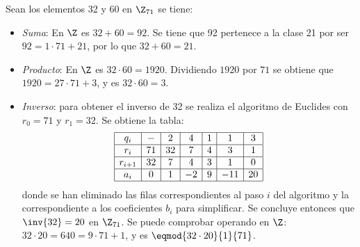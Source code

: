 \begin{TFGampliado}
\begin{ej}
    Sean los elementos 32 y 60 en $\Z_{71}$ se tiene:
        \begin{itemize}[label={--}]
            \item \textit{Suma}: En $\Z$ es $32 + 60 = 92$. Se tiene que 92 pertenece a la clase 21 por ser $92 = 1\cdot 71 + 21$, por lo que $32 + 60 = 21$.
            \item \textit{Producto}: En $\Z$ es $32 \cdot 60 = 1920$. Dividiendo $1920$ por $71$ se obtiene que $1920 = 27 \cdot 71 + 3$, y es $32 \cdot 60 = 3$.
            \item \textit{Inverso}: para obtener el inverso de 32 se realiza el algoritmo de Euclides con $r_0 = 71$ y $r_1 = 32$. Se obtiene la tabla:
            \renewcommand{\arraystretch}{1.3}
            \[
                \begin{array}{|c|c|c|c|c|c|c|}
                    \hline
                    q_i     &  - & 2  & 4 & 1 & 1   &  3\\
                    \hline
                    r_i     & 71 & 32 & 7 & 4 & 3   &   1\\
                    \hline
                    r_{i+1} & 32 & 7 &  4 & 3 & 1   &  0\\
                    \hline
                    a_i     &0 &  1& -2 & 9 & -11 &  20\\
                    \hline
                \end{array}
            \]
            donde se han eliminado las filas correspondientes al paso $i$ del algoritmo y la correspondiente a los coeficientes $b_i$ para simplificar. Se concluye entonces que $\inv{32} = 20$ en $\Z_{71}$. Se puede comprobar operando en $\Z$: $32\cdot 20 = 640 = 9\cdot71 + 1$, y es $\eqmod{32\cdot20}{1}{71}$.
            
        \end{itemize}
\end{ej}
\end{TFGampliado}

